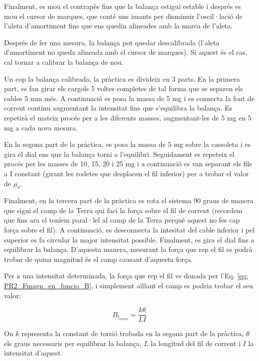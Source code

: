 \documentclass[11pt]{article}
\numberwithin{equation}{section}
\numberwithin{figure}{section}
\numberwithin{table}{section}
\begin{document}
Finalment, es mou el contrapès fins que la balança estigui estable i després es mou el cursor de marques, que conté uns imants per disminuir l'oscil·lació de l'aleta d'amortiment fins que ens quedin alineades amb la marca de l'aleta.

Després de fer una mesura, la balança pot quedar descalibrada (l'aleta d'amortiment no queda alineada amb el cursor de marques). Si aquest és el cas, cal tornar a calibrar la balança de nou.

Un cop la balança calibrada, la pràctica es divideix en 3 parts. En la primera part, es fan girar els cargols 5 voltes completes de tal forma que se separen els cables 5 mm més. A continuació es posa la massa de 5 mg i es connecta la font de corrent continu augmentant la intensitat fins que
s'equilibra la balança. Es repetirà el mateix procés per a les diferents masses, augmentant-les de 5 mg en 5 mg a cada nova mesura.

En la segona part de la pràctica, es posa la massa de 5 mg sobre la cassoleta i es gira el dial ens que la balança torni a l'equilibri. Seguidament es repeteix el procés per les masses de 10, 15, 20 i 25 mg i a continuació es van separant els fils a I constant (girant les rodetes que desplacen el fil inferior) per a trobar el valor de $\mu_o$.

Finalment, en la tercera part de la pràctica es rota el sistema 90 graus de manera que sigui el camp de la Terra qui faci la força sobre el fil de corrent (recordem que fins ara el teníem paral·lel al camp de la Terra perquè aquest no fes cap força sobre el fil). A continuació, es desconnecta la intesitat del cable inferior i pel superior es fa circular la major intensitat possible. Finalment, es gira el dial fins a equilibrar la balança. D’aquesta manera, mesurant la força que rep el fil es podrà trobar de quina magnitud és el camp causant d’aquesta força.

Per a una intensitat determinada, la força que rep el fil ve donada per l’Eq. \eqref{eq: PR2_Fmagn_en_funcio_B}, i simplement aïllant el camp es podria trobar el seu valor:

\begin{equation}\label{eq: PR2_Btnorm}
    B_{t_{norm}} = \frac{k\theta}{LI}
\end{equation}

On $k$ representa la constant de torsió trobada en la segona part de la pràctica, $\theta$ els graus necessaris per equilibrar la balança, $L$ la longitud del fil de corrent i $I$ la intensitat d'aquest.
\end{document}
